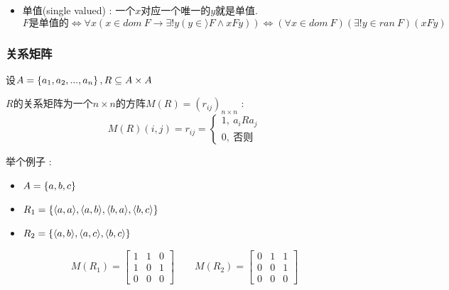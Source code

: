 {{{\begin{itemize}
{\begin{itemize}
{                  $F$是单根的 $\Leftrightarrow \forall y(y \in ran\ F \to \exists! x(x \in dom\ F \land xFy)) \Leftrightarrow (\forall y \in ran\ F)(\exists! x \in dom\ F)(xFy)$

                  \begin{itemize}
                    \item $\exists!$表示"存在唯一的"
                    \item $\forall x (x \in A \to B(x))$缩写为$(\forall x \in A)B(x)$
                    \item $\exists x (x \in A \land B(x))$缩写为$(\exists x \in A)B(x)$
                  \end{itemize}
                  }
            \item {
                  单值(single valued) : 一个$x$对应一个唯一的$y$就是单值.
                  $$
                    \mbox{$F$是单值的} \Leftrightarrow \forall x(x \in dom\ F \to \exists! y (y \in \rangle F \land xFy)) \Leftrightarrow (\forall x \in dom\ F)(\exists! y \in ran\ F)(xFy)
                  $$
                  }
          \end{itemize}
          }
  \end{itemize}
}%

\subsubsection{关系矩阵}{
  设$A = \left\{ a_1,a_2,...,a_n \right\},R \subseteq A \times A$

  $R$的关系矩阵为一个$n \times n$的方阵$M(R) = (r_{ij})_{n \times n}$ : $$
    M(R)(i,j) = r_{ij} = \begin{cases}
      1,\ a_iRa_j \\
      0,\ \mbox{否则}
    \end{cases}
  $$

  举个例子 : \begin{itemize}
    \item $A = \left\{ a,b,c \right\}$
    \item $R_1 = \left\{ \langle a,a\rangle,\langle a,b\rangle,\langle b,a\rangle,\langle b,c\rangle \right\}$
    \item $R_2 = \left\{ \langle a,b\rangle,\langle a,c\rangle,\langle b,c\rangle \right\}$
  \end{itemize}

  $$
    M(R_1) = \begin{bmatrix}
      1 & 1 & 0 \\
      1 & 0 & 1 \\
      0 & 0 & 0
    \end{bmatrix}
    \qquad
    M(R_2) = \begin{bmatrix}
      0 & 1 & 1 \\
      0 & 0 & 1 \\
      0 & 0 & 0
    \end{bmatrix}
  $$

}}}
